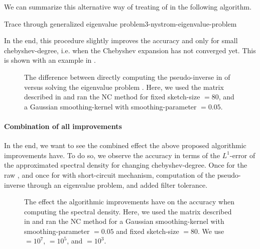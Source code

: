We can summarize this alternative way of treating
 of 
in the following algorithm.
\begin{algo}{Trace through generalized eigenvalue problem}{3-nystrom-eigenvalue-problem}
    
\end{algo}

In the end, this procedure slightly improves the accuracy
and only for small \gls{chebyshev-degree}, i.e. when the Chebyshev expansion has
not converged yet. This is shown with an example in .\\

\begin{figure}[ht]
    \centering
    
    \caption{The difference between directly computing the pseudo-inverse
        in  of 
        versus solving the eigenvalue problem .
        Here, we used the matrix described in 
        and ran the \gls{NC} method for fixed \gls{sketch-size} $=80$, and a
        Gaussian \gls{smoothing-kernel} with \gls{smoothing-parameter} $=0.05$.}
    \label{fig:3-nystrom-eigenvalue-problem}
\end{figure}

\paragraph{Combination of all improvements}

In the end, we want to see the combined effect the above proposed algorithmic
improvements have. To do so, we observe the accuracy in terms of the $L^1$-error
of the approximated spectral density for changing \gls{chebyshev-degree}. Once
for the raw , and once for 
with short-circuit mechanism, computation of the pseudo-inverse through
an eigenvalue problem, and added filter tolerance.

\begin{figure}[ht]
    \centering
    
    \caption{The effect the algorithmic improvements have on the accuracy when
        computing the spectral density.
        Here, we used the matrix described in 
        and ran the \gls{NC} method for a Gaussian \gls{smoothing-kernel} with \gls{smoothing-parameter} $=0.05$
        and fixed \gls{sketch-size} $=80$. We use
         $=10^7$,
         $=10^5$, and
         $=10^3$.}
    \label{fig:3-nystrom-improved-algorithm}
\end{figure}

